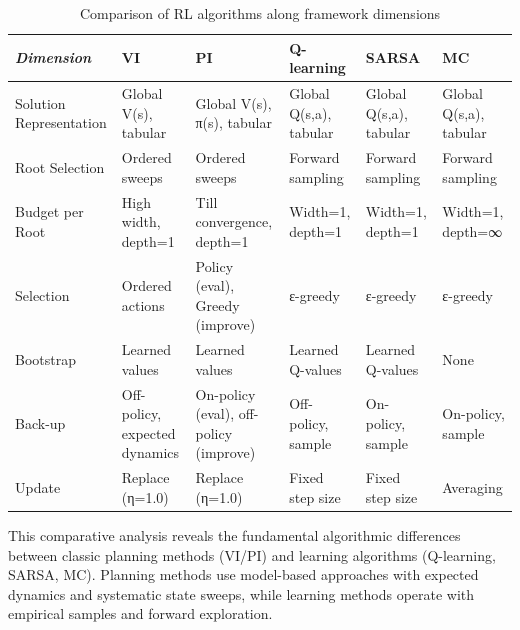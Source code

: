 
\begin{table}[h!]
\centering
\caption{Comparison of RL algorithms along framework dimensions}
\label{tab:algorithm-comparison}
\begin{tabular}{p{2.2cm}|p{1.8cm}p{1.8cm}p{1.8cm}p{1.8cm}p{1.8cm}}
\hline
\textit{Dimension} & VI & PI & Q-learning & SARSA & MC \\
\hline
Solution Representation & Global V(s), tabular & Global V(s), π(s), tabular & Global Q(s,a), tabular & Global Q(s,a), tabular & Global Q(s,a), tabular \\
\hline
Root Selection & Ordered sweeps & Ordered sweeps & Forward sampling & Forward sampling & Forward sampling \\
\hline
Budget per Root & High width, depth=1 & Till convergence, depth=1 & Width=1, depth=1 & Width=1, depth=1 & Width=1, depth=∞ \\
\hline
Selection & Ordered actions & Policy (eval), Greedy (improve) & ε-greedy & ε-greedy & ε-greedy \\
\hline
Bootstrap & Learned values & Learned values & Learned Q-values & Learned Q-values & None\footnotemark[4] \\
\hline
Back-up & Off-policy, expected dynamics & On-policy (eval), off-policy (improve) & Off-policy, sample & On-policy, sample & On-policy, sample \\
\hline
Update & Replace (η=1.0) & Replace (η=1.0) & Fixed step size & Fixed step size & Averaging \\
\hline
\end{tabular}
\end{table}


This comparative analysis reveals the fundamental algorithmic differences between classic planning methods (VI/PI) and learning algorithms (Q-learning, SARSA, MC). Planning methods use model-based approaches with expected dynamics and systematic state sweeps, while learning methods operate with empirical samples and forward exploration. 

